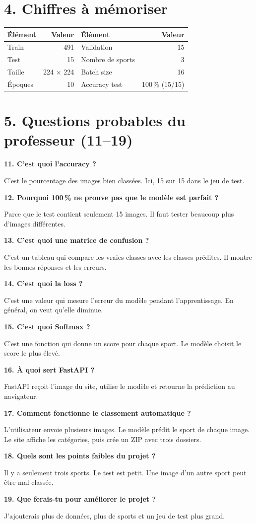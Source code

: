 \documentclass[10pt,a4paper]{article}
\newcommand{\question}[2]{\noindent\textbf{\color{vert}#1}\par #2\par\vspace{4pt}}
\begin{document}
\section{4. Chiffres à mémoriser}
\begin{center}
\begin{tabularx}{0.96\linewidth}{@{}Xr@{\qquad}Xr@{}}
\toprule
\textbf{Élément} & \textbf{Valeur} & \textbf{Élément} & \textbf{Valeur}\\
\midrule
Train & 491 & Validation & 15\\
Test & 15 & Nombre de sports & 3\\
Taille & 224 $\times$ 224 & Batch size & 16\\
Époques & 10 & Accuracy test & 100\,\% (15/15)\\
\bottomrule
\end{tabularx}
\end{center}

\newpage
\section{5. Questions probables du professeur (11--19)}
\question{11. C'est quoi l'accuracy ?}{C'est le pourcentage des images bien classées. Ici, 15 sur 15 dans le jeu de test.}
\question{12. Pourquoi 100\,\% ne prouve pas que le modèle est parfait ?}{Parce que le test contient seulement 15 images. Il faut tester beaucoup plus d'images différentes.}
\question{13. C'est quoi une matrice de confusion ?}{C'est un tableau qui compare les vraies classes avec les classes prédites. Il montre les bonnes réponses et les erreurs.}
\question{14. C'est quoi la loss ?}{C'est une valeur qui mesure l'erreur du modèle pendant l'apprentissage. En général, on veut qu'elle diminue.}
\question{15. C'est quoi Softmax ?}{C'est une fonction qui donne un score pour chaque sport. Le modèle choisit le score le plus élevé.}
\question{16. À quoi sert FastAPI ?}{FastAPI reçoit l'image du site, utilise le modèle et retourne la prédiction au navigateur.}
\question{17. Comment fonctionne le classement automatique ?}{L'utilisateur envoie plusieurs images. Le modèle prédit le sport de chaque image. Le site affiche les catégories, puis crée un ZIP avec trois dossiers.}
\question{18. Quels sont les points faibles du projet ?}{Il y a seulement trois sports. Le test est petit. Une image d'un autre sport peut être mal classée.}
\question{19. Que ferais-tu pour améliorer le projet ?}{J'ajouterais plus de données, plus de sports et un jeu de test plus grand.}
\end{document}
